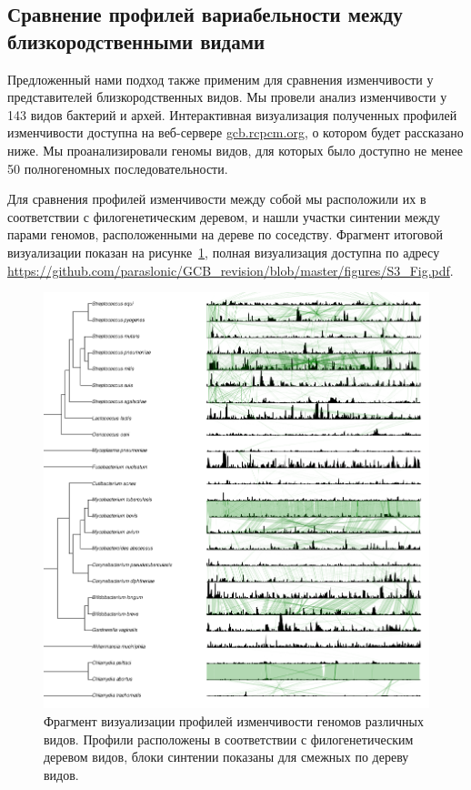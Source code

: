 \subsection*{Сравнение профилей вариабельности между близкородственными видами}

Предложенный нами подход также применим для сравнения изменчивости у представителей близкородственных видов. Мы провели анализ изменчивости у 143 видов бактерий и архей. Интерактивная визуализация полученных профилей изменчивости доступна на веб-сервере \url{gcb.rcpcm.org}, о котором будет рассказано ниже. Мы проанализировали геномы видов, для которых было доступно не менее 50 полногеномных последовательности.

Для сравнения профилей изменчивости между собой мы расположили их в соответствии с филогенетическим деревом, и нашли участки синтении между парами геномов, расположенными на дереве по соседству. Фрагмент итоговой визуализации показан на рисунке~\ref{img:tree_fragment}, полная визуализация доступна по адресу \url{https://github.com/paraslonic/GCB_revision/blob/master/figures/S3_Fig.pdf}.

\begin{figure}[!ht] 
  \center
    \includegraphics[width=\textwidth]{Dissertation/images/complexity/tree_fragment.png}
  \caption{Фрагмент визуализации профилей изменчивости геномов различных видов. Профили расположены в соответствии с филогенетическим деревом видов, блоки синтении показаны для смежных по дереву видов.   }
  \label{img:tree_fragment} 
\end{figure}

